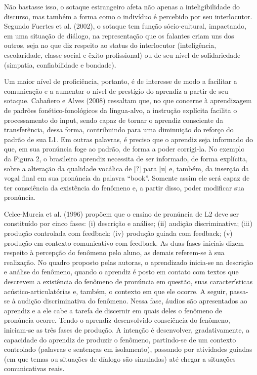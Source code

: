 N\~ao bastasse isso, o sotaque estrangeiro afeta n\~ao apenas a
inteligibilidade do discurso, mas tamb\'em a forma como o indiv\'iduo \'e
percebido por seu interlocutor. Segundo Fuertes et al. (2002), o sotaque
tem fun\c{c}\~ao s\'ocio-cultural, impactando, em uma situa\c{c}\~ao de di\'alogo, na
representa\c{c}\~ao que os falantes criam uns dos outros, seja no que diz
respeito ao status do interlocutor (intelig\^encia, escolaridade, classe
social e \^exito profissional) ou de seu n\'ivel de solidariedade (simpatia,
confiabilidade e bondade).

Um maior n\'ivel de profici\^encia, portanto, \'e de interesse de modo a
facilitar a comunica\c{c}\~ao e a aumentar o n\'ivel de prest\'igio do aprendiz a
partir de seu sotaque. Caba\~nero e Alves (2008) ressaltam que, no que
concerne à aprendizagem de padr\~oes fon\'etico-fonol\'ogicos da l\'ingua-alvo,
a instru\c{c}\~ao expl\'icita facilita o processamento do input, sendo capaz de
tornar o aprendiz consciente da transfer\^encia, dessa forma, contribuindo
para uma diminui\c{c}\~ao do refor\c{c}o do padr\~ao de sua L1. Em outras palavras,
\'e preciso que o aprendiz seja informado do que, em sua pron\'uncia foge ao
padr\~ao, de forma a poder corrigi-la. No exemplo da Figura 2, o
brasileiro aprendiz necessita de ser informado, de forma expl\'icita,
sobre a altera\c{c}\~ao da qualidade voc\'alica de {[}?{]} para {[}u{]} e,
tamb\'em, da inser\c{c}\~ao da vogal final em sua pron\'uncia da palavra ``book''.
Somente assim ele ser\'a capaz de ter consci\^encia da exist\^encia do
fen\^omeno e, a partir disso, poder modificar sua pron\'uncia.

Celce-Murcia et al. (1996) prop\~oem que o ensino de pron\'uncia de L2 deve
ser constitu\'ido por cinco fases: (i) descri\c{c}\~ao e an\'alise; (ii) audi\c{c}\~ao
discriminativa; (iii) produ\c{c}\~ao controlada com feedback; (iv) produ\c{c}\~ao
guiada com feedback; (v) produ\c{c}\~ao em contexto comunicativo com feedback.
As duas fases iniciais dizem respeito à percep\c{c}\~ao do fen\^omeno pelo
aluno, as demais referem-se à sua realiza\c{c}\~ao. No quadro proposto pelas
autoras, o aprendizado inicia-se na descri\c{c}\~ao e an\'alise do fen\^omeno,
quando o aprendiz \'e posto em contato com textos que descrevem a
exist\^encia do fen\^omeno de pron\'uncia em quest\~ao, suas caracter\'isticas
ac\'ustico-articulat\'orias e, tamb\'em, o contexto em que ele ocorre. A
seguir, passa-se à audi\c{c}\~ao discriminativa do fen\^omeno. Nessa fase,
\'audios s\~ao apresentados ao aprendiz e a ele cabe a tarefa de discernir
em quais deles o fen\^omeno de pron\'uncia ocorre. Tendo o aprendiz
desenvolvido consci\^encia do fen\^omeno, iniciam-se as tr\^es fases de
produ\c{c}\~ao. A inten\c{c}\~ao \'e desenvolver, gradativamente, a capacidade do
aprendiz de produzir o fen\^omeno, partindo-se de um contexto controlado
(palavras e senten\c{c}as em isolamento), passando por atividades guiadas
(em que temas ou situa\c{c}\~oes de d\'ialogo s\~ao simuladas) at\'e chegar a
situa\c{c}\~oes comunicativas reais.

